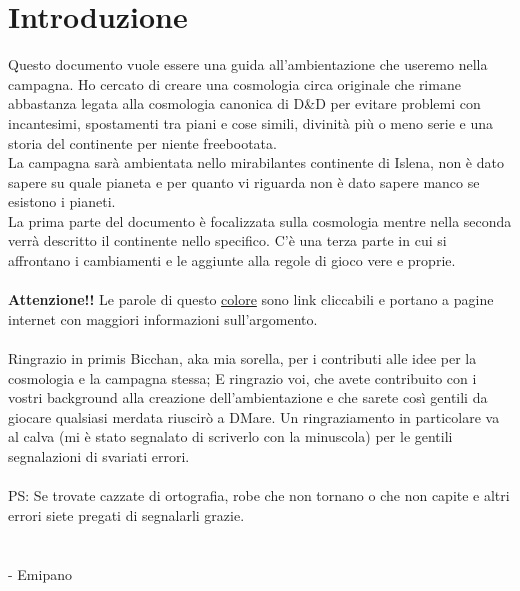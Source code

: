 \documentclass[10pt, a4paper]{report}
\begin{document}
\section{Introduzione}
Questo documento vuole essere una guida all'ambientazione che useremo nella campagna. Ho cercato di creare una cosmologia circa originale che rimane abbastanza legata alla cosmologia canonica di D\&D per evitare problemi con incantesimi, spostamenti tra piani e cose simili, divinità più o meno serie e una storia del continente per niente freebootata.\\
La campagna sarà ambientata nello mirabilantes continente di Islena, non è dato sapere su quale pianeta e per quanto vi riguarda non è dato sapere manco se esistono i pianeti. \\
La prima parte del documento è focalizzata sulla cosmologia mentre nella seconda verrà descritto il continente nello specifico. C'è una terza parte in cui si affrontano i cambiamenti e le aggiunte alla regole di gioco vere e proprie.\\
\\
\textbf{Attenzione!!} Le parole di questo \href{https://www.youtube.com/watch?v=xvFZjo5PgG0}{colore} sono link cliccabili e portano a pagine internet con maggiori informazioni sull'argomento.\\
\\
Ringrazio in primis Bicchan, aka mia sorella, per i contributi alle idee per la cosmologia e la campagna stessa; E ringrazio voi, che avete contribuito con i vostri background alla creazione dell'ambientazione e che sarete così gentili da giocare qualsiasi merdata riuscirò a DMare. Un ringraziamento in particolare va al calva (mi è stato segnalato di scriverlo con la minuscola) per le gentili segnalazioni di svariati errori.\\
\\
PS: Se trovate cazzate di ortografia, robe che non tornano o che non capite e altri errori siete pregati di segnalarli grazie.  \\
\\
\\
- Emipano
\end{document}

